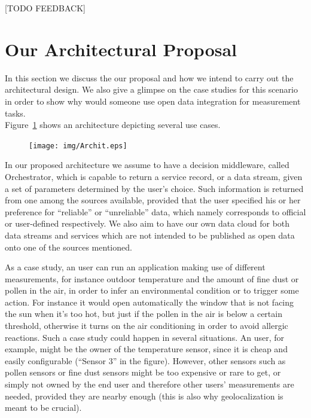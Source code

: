 \documentclass[conference]{IEEEtran}
\begin{document}
[TODO FEEDBACK]

\section{Our Architectural Proposal}
\label{casestudy}
In this section we discuss the our proposal and how we intend to carry out the architectural design.
We also give a glimpse on the case studies for this scenario in order to show why would someone use open data integration for measurement tasks.
\\
Figure~\ref{arch} shows an architecture depicting several use cases.

\begin{figure}[!t]
\centering
\texttt{[image: img/Archit.eps]} 
\caption{}
\label{arch}
\end{figure}

In our proposed architecture we assume to have a decision middleware, called Orchestrator, which is capable to return a service record, or a data stream, given a set of parameters determined by the user's choice.
Such information is returned from one among the sources available, provided that the user specified his or her preference for ``reliable'' or ``unreliable'' data, which namely corresponds to official or user-defined respectively.
We also aim to have our own data cloud for both data streams and services which are not intended to be published as open data onto one of the sources mentioned.

As a case study, an user can run an application making use of different measurements, for instance outdoor temperature and the amount of fine dust or pollen in the air, in order to infer an environmental condition or to trigger some action.
For instance it would open automatically the window that is not facing the sun when it's too hot, but just if the pollen in the air is below a certain threshold, otherwise it turns on the air conditioning in order to avoid allergic reactions.
Such a case study could happen in several situations.
An user, for example, might be the owner of the temperature sensor, since it is cheap and easily configurable (``Sensor 3'' in the figure).
However, other sensors such as pollen sensors or fine dust sensors might be too expensive or rare to get, or simply not owned by the end user and therefore other users' measurements are needed, provided they are nearby enough (this is also why geolocalization is meant to be crucial).
\end{document}
